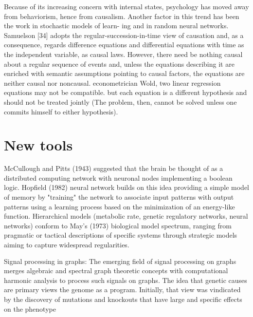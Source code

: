 \documentclass[onecollarge,runningheads]{svjour2}
\begin{document}
Because of its increasing concern with internal states, psychology has moved away from behaviorism, hence from causalism. Another factor in this trend has been the work in stochastic models of learn- ing and in random neural networks.
Samuelson [34] adopts the regular-succession-in-time view of causation  and, as a consequence, regards difference equations and differential equations with time as the independent variable, as causal laws. However, there need be nothing causal about a regular sequence of events and, unless the equations describing it are enriched with semantic assumptions pointing to causal factors, the equations are neither causal nor noncausal.
 econometrician Wold,  two linear regression equations may not be compatible. but each equation is a different hypothesis and should not be treated jointly (The problem, then, cannot be solved unless one commits himself to either hypothesis). 


\section{New tools}
McCullough and Pitts (1943) suggested that the brain be thought of as a distributed computing network with neuronal nodes implementing a boolean logic. Hopfield (1982) neural network builds on this idea providing a simple model of memory by "training" the network to associate input patterns with output patterns using a learning process based on the minimization of an energy-like function.
Hierarchical models  (metabolic rate, genetic regulatory networks, neural networks) conform to May's (1973) biological model spectrum, ranging from pragmatic or tactical descriptions of specific systems through strategic models aiming to capture widespread regularities.%

Signal processing in graphs: The emerging field of signal processing on graphs merges algebraic and spectral graph theoretic concepts with computational harmonic analysis to process such signals on graphs.  The idea that genetic causes are primary views the genome as a program. Initially, that view was vindicated by the discovery of mutations and knockouts that have large and specific effects on the phenotype

\citep{shuman2013emerging}


\end{document}
